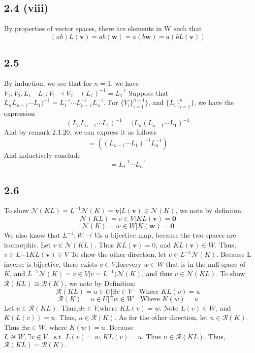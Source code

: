 \documentclass[letterpaper,12pt]{article}
\theoremstyle{definition}
\begin{document}
\subsection*{2.4 (viii)}
By properties of vector spaces, there are elements in W such that 
\[(ab)L(\mathbf{v} ) = ab(\mathbf{w} ) = a(b \mathbf{w} ) = a(bL(\mathbf{v} ))\]

\subsection*{2.5}
By induction, we see that for $n=1$, we have $V_1, V_2, L_1 \quad L_1: V_1 \rightarrow V_2 \quad (L_1)^{-1} = L_1^{-1}$
Suppose that $L_n L_{n-1}\cdots L_1)^{-1} = L_1^{-1}\cdots L_{n-1}^{-1}L_n^{-1}$. For $\{V_i\}_{i=1}^{n+1}\}$, and $\{L_i\}_{i=1}^{n}\}$, we have the expression
\[(L_n L_{n-1}\cdots L_1)^{-1} =(L_n( L_{n-1}\cdots L_1)^{-1}\]
And by remark 2.1.20, we can express it as follows
\[ = (( L_{n-1}\cdots L_1)^{-1}L_n^{-1})\]
And inductively conclude
\[= L_1^{-1}\cdots L_n^{-1}\]


\subsection*{2.6}

To show $\mathscr{N} (KL) = L^{−1}\mathscr{N} (K) = {\mathbf{v}  \vert L(\mathbf{v} ) \in \mathscr{N} (K)}$, we note by definiton:
\[\mathscr{N} (KL)={v \in V \vert KL(\mathbf{v} )=\mathbf{0} } \]
\[\mathscr{N} (K)={w \in W \vert K( \mathbf{w} )=\mathbf{0} }\]
We also know that $L^{−1} : W \rightarrow V $is a bijective map, because the two spaces are isomorphic. Let $v \in \mathscr{N} (KL)$. Thus $KL(\mathbf{v} ) = 0$, and $KL(\mathbf{v} ) \in W$. Thus, $v ∈ L{−1}KL(\mathbf{v} ) \in V$
To show the other direction, let $v \in L^{-1}\mathscr{N} (K)$. Because L inverse is bijective, there exists $v \in V$,forevery $w \in W$ that is in the null space of $K$, and $L^{−1}\mathscr{N}(K)={v \in V \vert v = L^{−1}(\mathscr{N} (K)}$, and thus $v  \in  \mathscr{N} (KL)$.
To show $\mathscr{R}(KL) \cong \mathscr{R}(K)$, we note by Definition:
\[\mathscr{R}(KL) = {u  \in U \vert \exists v  \in V \quad \text{Where } KL(v) = u}\]
\[\mathscr{R}(K) = {u \in U \vert \exists w ∈ W \quad \text{Where } K(w) = u}\]
Let $u \in \mathscr{R}(KL)$. Thus,$\exists  v \in V$,where $KL(v)=w$. Note $L(v) \in W$, and $K(L(v))= u$. Thus, $u  \in \mathscr{R}(K)$.
As for the other direction, let $u  \in \mathscr{R}(K)$. Thus  $\exists w  \in W$, where $K(w) = u$. Because $L \cong W, \exists v \in V \quad \text{s.t. } L(v)=w, KL(v)=u$. Thus $u \in \mathscr{R}(KL)$.
Thus, $\mathscr{R}(KL) = \mathscr{R}(K).$
 
\end{document}
